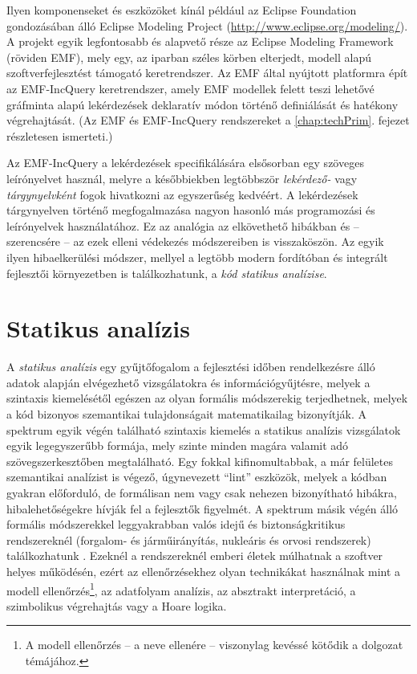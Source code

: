 Ilyen komponenseket és eszközöket kínál például az Eclipse Foundation gondozásában álló Eclipse Modeling Project (\url{http://www.eclipse.org/modeling/}).
A projekt egyik legfontosabb és alapvető része az Eclipse Modeling Framework (röviden \gls{EMF}), mely egy, az iparban széles körben elterjedt, modell alapú szoftverfejlesztést támogató keretrendszer.
Az \gls{EMF} által nyújtott platformra épít az EMF-IncQuery keretrendszer, amely \gls{EMF} modellek felett teszi lehetővé gráfminta alapú lekérdezések deklaratív módon történő definiálását és hatékony végrehajtását.
(Az \gls{EMF} és EMF-IncQuery rendszereket a \ref{chap:techPrim}. fejezet részletesen ismerteti.)

Az EMF-IncQuery a lekérdezések specifikálására elsősorban egy szöveges leírónyelvet használ, melyre a későbbiekben legtöbbször \emph{lekérdező-} vagy \emph{tárgynyelvként} fogok hivatkozni az egyszerűség kedvéért.
A lekérdezések tárgynyelven történő megfogalmazása nagyon hasonló más programozási és leírónyelvek használatához.
Ez az analógia az elkövethető hibákban és -- szerencsére -- az ezek elleni védekezés módszereiben is visszaköszön.
Az egyik ilyen hibaelkerülési módszer, mellyel a legtöbb modern fordítóban és integrált fejlesztői környezetben is találkozhatunk, a \emph{kód statikus analízise}.

\section{Statikus analízis}

A \emph{statikus analízis} egy gyűjtőfogalom a fejlesztési időben rendelkezésre álló adatok alapján elvégezhető vizsgálatokra és információgyűjtésre, melyek a szintaxis kiemelésétől egészen az olyan formális módszerekig terjedhetnek, melyek a kód bizonyos szemantikai tulajdonságait matematikailag bizonyítják.
A spektrum egyik végén található szintaxis kiemelés a statikus analízis vizsgálatok egyik legegyszerűbb formája, mely szinte minden magára valamit adó szövegszerkesztőben megtalálható.
Egy fokkal kifinomultabbak, a már felületes szemantikai analízist is végező, úgynevezett ``lint'' eszközök, melyek a kódban gyakran előforduló, de formálisan nem vagy csak nehezen bizonyítható hibákra, hibalehetőségekre hívják fel a fejlesztők figyelmét.
A spektrum másik végén álló formális módszerekkel leggyakrabban valós idejű és biztonságkritikus rendszereknél (forgalom- és járműirányítás, nukleáris és orvosi rendszerek) találkozhatunk \cite{Storey:1996:SCC:524721}.
Ezeknél a rendszereknél emberi életek múlhatnak a szoftver helyes működésén, ezért az ellenőrzésekhez olyan technikákat használnak mint a modell ellenőrzés\footnote{A modell ellenőrzés -- a neve ellenére -- viszonylag kevéssé kötődik a dolgozat témájához.}, az adatfolyam analízis, az absztrakt interpretáció, a szimbolikus végrehajtás vagy a Hoare logika.

